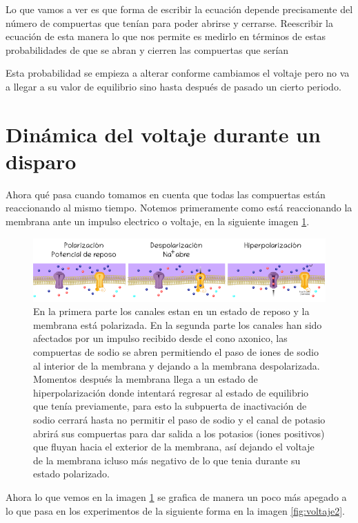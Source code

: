 Lo que vamos a ver es que forma de escribir la ecuación depende precisamente del número de compuertas que tenían para poder abrirse y cerrarse. Reescribir la ecuación de esta manera lo que nos permite es medirlo en términos de estas probabilidades de que se abran y cierren las compuertas que serían 

Esta probabilidad se empieza a alterar conforme cambiamos el voltaje pero no va a llegar a su valor de equilibrio sino hasta después de pasado un cierto periodo.


\section{Dinámica del voltaje durante un disparo} 

Ahora qué pasa cuando tomamos en cuenta que todas las compuertas están reaccionando al mismo tiempo.
Notemos primeramente como está reaccionando la membrana ante un impulso electrico o voltaje, en la siguiente imagen \ref{fig:voltaje1}.

\begin{figure}[h]
 \centering
 \includegraphics[scale=0.5]{../Figuras/polarizacion1.png}
 \caption{En la primera parte los canales estan en un estado de reposo y la membrana está polarizada. En la segunda parte los canales han sido afectados por un impulso recibido desde el cono axonico, las compuertas de sodio se abren permitiendo el paso de iones de sodio al interior de la membrana y dejando a la membrana despolarizada. Momentos después la membrana llega a un estado de hiperpolarización donde intentará regresar al estado de equilibrio que tenía previamente, para esto la subpuerta de inactivación de sodio cerrará hasta no permitir el paso de sodio y el canal de potasio abrirá sus compuertas para dar salida a los potasios (iones positivos) que fluyan hacia el exterior de la membrana, así dejando el voltaje de la membrana icluso más negativo de lo que tenia durante su estado polarizado. }
 \label{fig:voltaje1}
\end{figure}

Ahora lo que vemos en la imagen \ref{fig:voltaje1} se grafica de manera un poco más apegado a lo que pasa en los experimentos de la siguiente forma en la imagen \ref{fig:voltaje2}.

